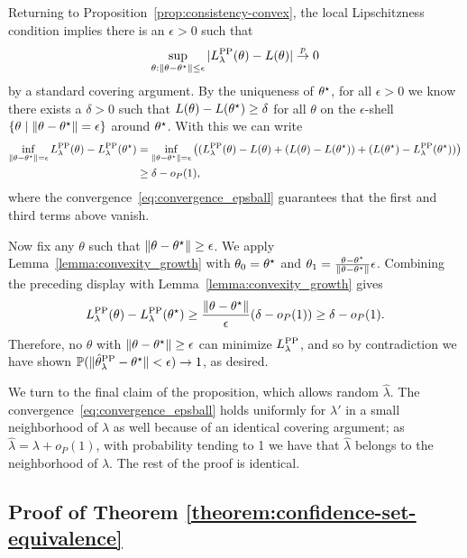 Returning to Proposition~\ref{prop:consistency-convex}, the local
Lipschitzness condition implies there is an $\epsilon > 0$ such that
\begin{align}
  \label{eq:convergence_epsball}
  \sup_{\theta:\|\theta-\theta^\star\|\leq \epsilon} |L^{\mathrm{PP}}_{\lambda}(\theta) - L(\theta)| \stackrel{p}{\rightarrow} 0
\end{align}
by a standard covering argument.
%
By the uniqueness of $\theta^\star$, for all
$\epsilon>0$ we know there exists a $\delta>0$ such that $L(\theta) -
L(\theta^\star)\geq \delta$ for all $\theta$ on the $\epsilon$-shell $\{\theta
\mid \left\|{\theta -
\theta^\star}\right\|=\epsilon\}$ around $\theta^\star$.
%
With this we can write
\begin{align*}
  \inf_{\left\|{\theta-\theta^\star}\right\| = \epsilon}
  L^{\mathrm{PP}}_{\lambda}(\theta) - L^{\mathrm{PP}}_{\lambda}(\theta^\star)
  & = \inf_{\left\|{\theta - \theta^\star}\right\| =\epsilon} \left((L^{\mathrm{PP}}_{\lambda}(\theta) - L(\theta) + (L(\theta) - L(\theta^\star)) + (L(\theta^\star) - L^{\mathrm{PP}}_{\lambda}(\theta^\star))\right)\\
  &\geq \delta - o_P(1),
\end{align*}
where the convergence~\eqref{eq:convergence_epsball}
guarantees that the first and third terms above vanish.

Now fix any $\theta$ such that $\left\|{\theta-\theta^\star}\right\| \geq \epsilon$. We
apply Lemma~\ref{lemma:convexity_growth} with $\theta_0 = \theta^\star$ and
$\theta_1 = \frac{\theta-\theta^\star}{\|\theta-\theta^\star\|}\epsilon$.
Combining the preceding
display with Lemma~\ref{lemma:convexity_growth} gives
\begin{equation*}
  L^{\mathrm{PP}}_{\lambda}(\theta) - L^{\mathrm{PP}}_{\lambda}(\theta^\star) \geq \frac{\|\theta-\theta^\star\|}{\epsilon}(\delta-o_P(1)) \geq \delta - o_P(1).
\end{equation*}
Therefore, no $\theta$ with $\|\theta-\theta^\star\|\geq \epsilon$ can
minimize $L^{\mathrm{PP}}_{\lambda}$, and so by contradiction we have shown
$\mathbb{P}(\|{\hat{\theta}^{\mathrm{PP}}_{\lambda} - \theta^\star}\|< \epsilon)\to 1$, as desired.

We turn to the final claim of the proposition, which allows random
$\hat{\lambda}$. The convergence~\eqref{eq:convergence_epsball} holds
uniformly for $\lambda'$ in a small neighborhood of $\lambda$ as well
because of an identical covering argument; as $\hat{\lambda} = \lambda +
o_P(1)$, with probability tending to 1 we have that $\hat{\lambda}$ belongs to
the neighborhood of $\lambda$. The rest of the proof is identical.


\subsection{Proof of Theorem \ref{theorem:confidence-set-equivalence}}
\label{sec:proof-confidence-set-equivalence}

